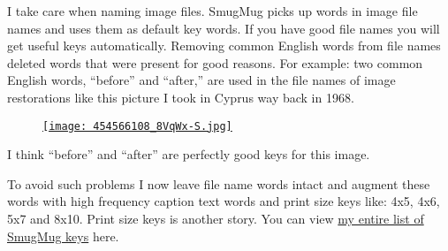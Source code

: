 I take care when naming image files. SmugMug picks up words in image
file names and uses them as default key words. If you have good file
names you will get useful keys automatically. Removing common English
words from file names deleted words that were present for good reasons.
For example: two common English words, ``before'' and ``after,'' are
used in the file names of image restorations like this picture I took in
Cyprus way back in 1968.

\captionsetup[floatingfigure]{labelformat=empty}
\begin{figure}[htbp]
\centering
\href{http://conceptcontrol.smugmug.com/Themes/Manipulations/Restorations-1/7091264\_YtJ46\#454566108\_8VqWx}{\texttt{[image: 454566108\_8VqWx-S.jpg]}}
\label{fig:416X0}
\end{figure}

I think ``before'' and ``after'' are perfectly good keys for this image.

To avoid such problems I now leave file name words intact and augment
these words with high frequency caption text words and print size keys
like: 4x5, 4x6, 5x7 and 8x10. Print size keys is another story. You can
view \href{http://conceptcontrol.smugmug.com/keyword/}{my entire list of
SmugMug keys} here.




%